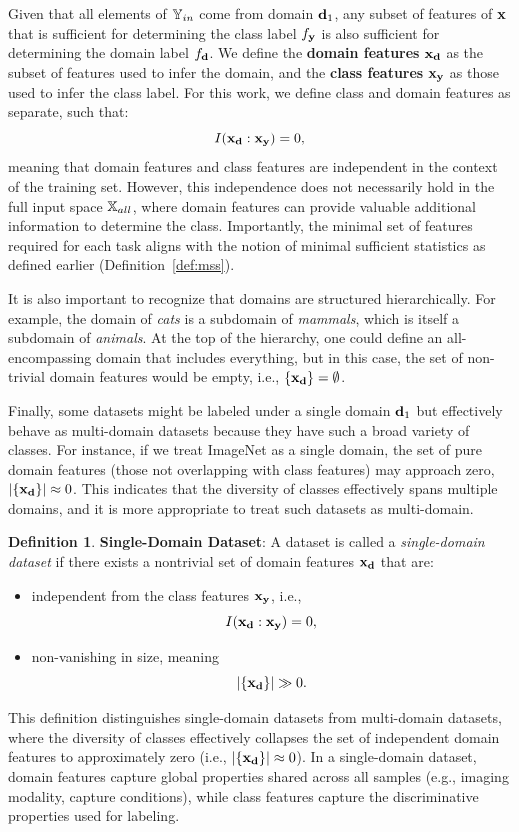 \documentclass[11pt, oneside]{book}
\theoremstyle{plain}
\theoremstyle{definition}
\newtheorem{definition}[theorem]{Definition}
\theoremstyle{remark}
\begin{document}
Given that all elements of \( {\mathbb{Y}}_{in} \) come from domain \( {\mathbf{d}}_1 \), any subset of features of \( {\mathbf{x}} \) that is sufficient for determining the class label \( f_{{\mathbf{y}}} \) is also sufficient for determining the domain label \( f_{{\mathbf{d}}} \). We define the \textbf{domain features} \( {\mathbf{x}}_{{\mathbf{d}}} \) as the subset of features used to infer the domain, and the \textbf{class features} \( {\mathbf{x}}_{{\mathbf{y}}} \) as those used to infer the class label. For this work, we define class and domain features as separate, such that:
\[
I({\mathbf{x}}_{{\mathbf{d}}} : {\mathbf{x}}_{{\mathbf{y}}}) = 0,
\]
meaning that domain features and class features are independent in the context of the training set. However, this independence does not necessarily hold in the full input space \( {\mathbb{X}}_{all} \), where domain features can provide valuable additional information to determine the class. Importantly, the minimal set of features required for each task aligns with the notion of minimal sufficient statistics as defined earlier (Definition~\ref{def:mss}).

It is also important to recognize that domains are structured hierarchically. For example, the domain of \textit{cats} is a subdomain of \textit{mammals}, which is itself a subdomain of \textit{animals}. At the top of the hierarchy, one could define an all-encompassing domain that includes everything, but in this case, the set of non-trivial domain features would be empty, i.e., \( \{{\mathbf{x}}_{{\mathbf{d}}}\} = \emptyset \).

Finally, some datasets might be labeled under a single domain \( {\mathbf{d}}_1 \) but effectively behave as multi-domain datasets because they have such a broad variety of classes. For instance, if we treat ImageNet as a single domain, the set of pure domain features (those not overlapping with class features) may approach zero, \( |\{{\mathbf{x}}_{{\mathbf{d}}}\}| \approx 0 \). This indicates that the diversity of classes effectively spans multiple domains, and it is more appropriate to treat such datasets as multi-domain.


\begin{definition}
\textbf{Single-Domain Dataset}:  
A dataset is called a \emph{single-domain dataset} if there exists a nontrivial set of domain features \( {\mathbf{x}}_{{\mathbf{d}}} \) that are:
\begin{itemize}
    \item independent from the class features \( {\mathbf{x}}_{{\mathbf{y}}} \), i.e., 
    \[
    I({\mathbf{x}}_{{\mathbf{d}}} : {\mathbf{x}}_{{\mathbf{y}}}) = 0,
    \]
    \item non-vanishing in size, meaning 
    \[
    |\{{\mathbf{x}}_{{\mathbf{d}}}\}| \gg 0.
    \]
\end{itemize}
This definition distinguishes single-domain datasets from multi-domain datasets, where the diversity of classes effectively collapses the set of independent domain features to approximately zero (i.e., \( |\{{\mathbf{x}}_{{\mathbf{d}}}\}| \approx 0 \)). In a single-domain dataset, domain features capture global properties shared across all samples (e.g., imaging modality, capture conditions), while class features capture the discriminative properties used for labeling.
\label{def:singledomain}
\end{definition}
\end{document}

